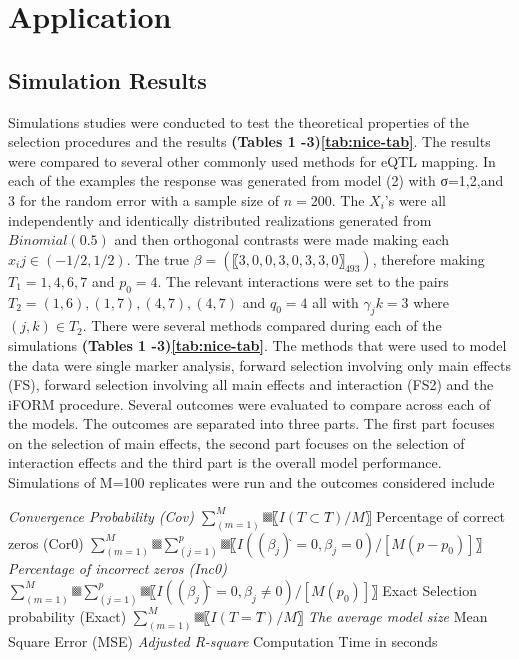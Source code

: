 \documentclass[]{book}
\theoremstyle{definition}
\theoremstyle{definition}
\theoremstyle{remark}
\begin{document}
\section{Application}\label{application}

\subsection{Simulation Results}\label{simulation-results}

Simulations studies were conducted to test the theoretical properties of
the selection procedures and the results \textbf{(Tables 1
-3)\ref{tab:nice-tab}}. The results were compared to several other
commonly used methods for eQTL mapping. In each of the examples the
response was generated from model (2) with σ=1,2,and 3 for the random
error with a sample size of \(n=200\). The \(X_i\)'s were all
independently and identically distributed realizations generated from
\(Binomial(0.5)\) and then orthogonal contrasts were made making each
\(x_ij∈(-1/2,1/2)\). The true \(β=(〖3,0,0,3,0,3,3,0〗_493)\), therefore
making \(T_1={1,4,6,7}\) and \(p_0=4\). The relevant interactions were
set to the pairs \(T_2={(1,6),(1,7),(4,7),(4,7)}\) and \(q_0=4\) all
with \(γ_jk=3\) where \((j,k)∈T_2\). There were several methods compared
during each of the simulations \textbf{(Tables 1 -3)\ref{tab:nice-tab}}.
The methods that were used to model the data were single marker
analysis, forward selection involving only main effects (FS), forward
selection involving all main effects and interaction (FS2) and the iFORM
procedure. Several outcomes were evaluated to compare across each of the
models. The outcomes are separated into three parts. The first part
focuses on the selection of main effects, the second part focuses on the
selection of interaction effects and the third part is the overall model
performance. Simulations of M=100 replicates were run and the outcomes
considered include

\emph{Convergence Probability (Cov) \(∑_(m=1)^M▒〖I(T⊂T ̂ )/M〗\)
}Percentage of correct zeros (Cor0)
\(∑_(m=1)^M▒∑_(j=1)^p▒〖I((β_j ) ̂=0,β_j=0)/[M(p-p_0)]〗\)
\emph{Percentage of incorrect zeros (Inc0)
\(∑_(m=1)^M▒∑_(j=1)^p▒〖I((β_j ) ̂=0,β_j≠0)/[M(p_0)]〗\) }Exact Selection
probability (Exact) \(∑_(m=1)^M▒〖I(T=T ̂ )/M 〗\) \emph{The average
model size }Mean Square Error (MSE) \emph{Adjusted R-square }Computation
Time in seconds
\end{document}
